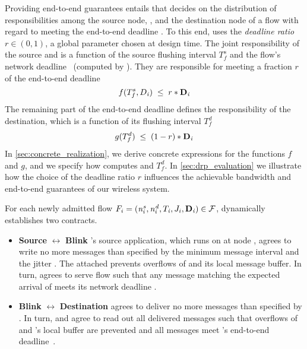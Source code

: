 Providing end-to-end guarantees entails that \DRP decides on the {distribution of responsibilities} among the source node, \blink, and the destination node of a flow \flowi with regard to meeting the end-to-end deadline \deadlinei. To this end, \DRP uses the \emph{deadline ratio}~$r \in (0,1)$, a global parameter chosen at design time.
The joint responsibility of the source and \blink is a function of the source flushing interval $T_f^s$ and the flow's network deadline \ndeadlinei~(computed by \DRP). They are responsible for meeting a fraction $r$ of the end-to-end deadline
\begin{equation}\label{eq:function_f}
 f(T_f^s,D_{\mathit{i}}) \; \leq \; r * \mathbf{D}_{\mathit{i}}
\end{equation}
The remaining part of the end-to-end deadline defines the responsibility of the destination, which is a function of its flushing interval $T_f^d$
\begin{equation}\label{eq:function_g}
 g(T_f^d) \; \leq \;  (1-r) * \mathbf{D}_{\mathit{i}}
\end{equation}
In \cref{sec:concrete_realization}, we derive concrete expressions for the functions $f$ and $g$, and we specify how \DRP computes \ndeadlinei and $T_f^d$.
In \cref{sec:drp_evaluation} we illustrate how the choice of the deadline ratio $r$ influences the achievable bandwidth and end-to-end guarantees of our wireless \CPs system.

For each newly admitted flow $F_{i} = (\mathit{n^s_{i}},\mathit{n^d_{i}},T_{\mathit{i}},J_{i},\mathbf{D}_{\mathit{i}}) \in \mathcal{F}$, \DRP dynamically establishes two contracts.

\begin{itemize}
	\item \textbf{Source} $\boldsymbol{\leftrightarrow}$ \textbf{Blink}
  \quad
  \flowi's source application, which runs on \apsrc at node  \flowsrci, agrees to write no more messages than specified by the minimum message interval \periodi and the jitter \jitteri. The attached \cpsrc prevents overflows of \bolt and its local message buffer.
	In turn, \blink agrees to serve flow \flowi such that any message matching the expected arrival of \flowi meets its network deadline \ndeadlinei.

	\item \textbf{Blink} $\boldsymbol{\leftrightarrow}$ \textbf{Destination}
  \quad
  \blink agrees to deliver no more messages than specified by \periodi.
	In turn, \cpdst and \apdst agree to read out all delivered messages such that overflows of \bolt and \cpdst's local  buffer are prevented and all messages meet \flowi's end-to-end deadline~\deadlinei.
\end{itemize}

